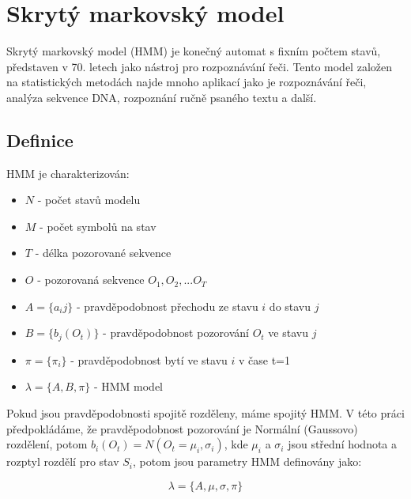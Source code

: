\section{Skrytý markovský model}

Skrytý markovský model (HMM) je konečný automat s fixním počtem stavů, představen v 70. letech jako nástroj pro rozpoznávání řeči. Tento model založen na statistických metodách najde mnoho aplikací jako je rozpoznávání řeči, analýza sekvence DNA, rozpoznání ručně psaného textu a další.

\subsection{Definice}
HMM je charakterizován:
\begin{itemize}
    \item \(N\) - počet stavů modelu
    \item \(M\) - počet symbolů na stav
    \item \(T\) - délka pozorované sekvence
    \item \(O\) - pozorovaná sekvence \(O_1, O_2, ... O_T\)
    \item \(A = \{a_ij\}\) - pravděpodobnost přechodu ze stavu \(i\) do stavu \(j\)
    \item \(B = \{b_j(O_t)\}\) - pravděpodobnost pozorování \(O_t\) ve stavu \(j\)
    \item \(\pi = \{\pi_i\}\) - pravděpodobnost bytí ve stavu \(i\) v čase t=1
    \item \(\lambda = \{A, B, \pi\}\) - HMM model
\end{itemize}

Pokud jsou pravděpodobnosti spojitě rozděleny, máme spojitý HMM. V této práci předpokládáme, že pravděpodobnost pozorování je Normální (Gaussovo) rozdělení, potom \(b_i(O_t) = N(O_t = \mu_i, \sigma_i)\), kde \(\mu_i\) a \(\sigma_i\) jsou střední hodnota a rozptyl rozdělí pro stav \(S_i\), potom jsou parametry HMM definovány jako:

\[ \lambda = \{A, \mu, \sigma, \pi\} \]

